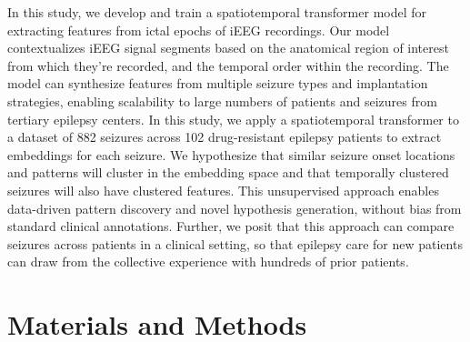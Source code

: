 \documentclass[11pt]{article}
\begin{document}
In this study, we develop and train a spatiotemporal transformer model for extracting features from ictal epochs of iEEG recordings. Our model contextualizes iEEG signal segments based on the anatomical region of interest from which they’re recorded, and the temporal order within the recording. The model can synthesize features from multiple seizure types and implantation strategies, enabling scalability to large numbers of patients and seizures from tertiary epilepsy centers. In this study, we apply a spatiotemporal transformer to a dataset of 882 seizures across 102 drug-resistant epilepsy patients to extract embeddings for each seizure. We hypothesize that similar seizure onset locations and patterns will cluster in the embedding space and that temporally clustered seizures will also have clustered features. This unsupervised approach enables data-driven pattern discovery and novel hypothesis generation, without bias from standard clinical annotations. Further, we posit that this approach can compare seizures across patients in a clinical setting, so that epilepsy care for new patients can draw from the collective experience with hundreds of prior patients.

\section*{Materials and Methods}
\end{document}
